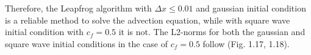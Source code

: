 \documentclass[11pt,a4paper]{article}
\begin{document}
\begin{figure}[!h]
\centering
{}
\end{figure}
Therefore, the Leapfrog algorithm with $\Delta x \leq 0.01$ and gaussian initial condition is a reliable method to solve the advection equation, while with square wave initial condition with $c_f = 0.5$ it is not. The L2-norms for both the gaussian and square wave initial conditions in the case of $c_f=0.5$ follow (Fig. 1.17, 1.18). 
\end{document}

